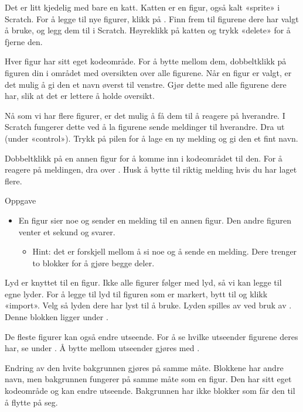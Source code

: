 \documentclass[a4paper]{article}
\newcommand{\block}[2][-0.4]{\raisebox{#1\height}{\texttt{[image: \#2]}}}
\begin{document}
\begin{large}

Det er litt kjedelig med bare en katt. Katten er en figur, også kalt «sprite» 
i Scratch. For å legge til nye figurer, klikk på \block{new_sprite}. Finn frem til 
figurene dere har valgt å bruke, og legg dem til i Scratch. Høyreklikk på katten
og trykk «delete» for å fjerne den.


Hver figur har sitt eget kodeområde. For å bytte mellom dem, dobbeltklikk på 
figuren din i området med oversikten over alle figurene. Når en figur er valgt, 
er det mulig å gi den et navn øverst til venstre. Gjør dette med alle figurene
dere har, slik at det er lettere å holde oversikt.

Nå som vi har flere figurer, er det mulig å få dem til å reagere på hverandre. 
I Scratch fungerer dette ved å la figurene sende meldinger til hverandre.
Dra ut \block{broadcast} (under «control»). Trykk på pilen for å lage en ny 
melding og gi den et fint navn.

Dobbeltklikk på en annen figur for å komme inn i kodeområdet til den. For å reagere
på meldingen, dra over \block{receive} . Husk å bytte til riktig melding hvis du har laget flere.

Oppgave
\begin{itemize}
    \item En figur sier noe og sender en melding til en annen figur. Den andre figuren venter et sekund og svarer.
    \begin{itemize}
        \item Hint: det er forskjell mellom å si noe og å sende en melding. Dere trenger to blokker for å gjøre begge deler.
    \end{itemize}
\end{itemize}

\newpage

Lyd er knyttet til en figur. Ikke alle figurer følger med lyd, så vi kan legge til egne lyder. 
For å legge til lyd til figuren som er markert, bytt til \block{sounds} og klikk «import».
Velg så lyden dere har lyst til å bruke. Lyden spilles av ved bruk av \block{play_sound}. 
Denne blokken ligger under \block{sound}.

De fleste figurer kan også endre utseende. For å se hvilke utseender figurene deres har, 
se under \block{costumes}. Å bytte mellom utseender gjøres med \block{switch_costume}.

Endring av den hvite bakgrunnen gjøres på samme måte. Blokkene har andre navn, 
men bakgrunnen fungerer på samme måte som en figur. Den har sitt eget kodeområde og kan endre utseende. 
Bakgrunnen har ikke blokker som får den til å flytte på seg.


\end{large}
\end{document}
